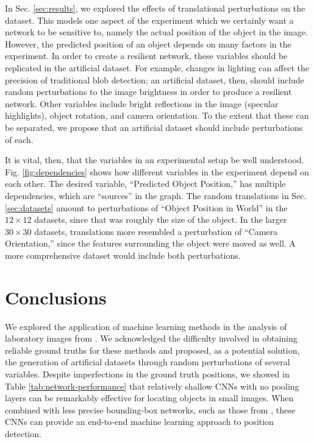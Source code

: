 \documentclass[twocolumn, 10pt]{asme2ej}
\begin{document}
In Sec. \ref{sec:results}, we explored the effects of translational
perturbations on the dataset. This models one aspect of the experiment which we
certainly want a network to be sensitive to, namely the actual position of the
object in the image. However, the predicted position of an object depends on
many factors in the experiment. In order to create a resilient network, these
variables should be replicated in the artificial dataset. For example, changes
in lighting can affect the precision of traditional blob detection; an
artificial dataset, then, should include random perturbations to the image
brightness in order to produce a resilient network. Other variables include
bright reflections in the image (specular highlights), object rotation, and
camera orientation. To the extent that these can be separated, we propose that
an artificial dataset should include perturbations of each.

It is vital, then, that the variables in an experimental setup be well
understood. Fig. \ref{fig:dependencies} shows how different variables in the
experiment depend on each other. The desired variable, ``Predicted Object
Position,'' has multiple dependencies, which are ``sources'' in the graph. The
random translations in Sec. \ref{sec:datasets} amount to perturbations of
``Object Position in World'' in the $12 \times 12$ datasets, since that was
roughly the size of the object. In the larger $30\times 30$ datasets,
translations more resembled a perturbation of ``Camera Orientation,'' since the
features surrounding the object were moved as well. A more comprehensive dataset
would include both perturbations.

\section{Conclusions}
\label{sec:conclusions}

We explored the application of machine learning methods in the analysis of
laboratory images from \cite{nash_topological_2015}. We acknowledged the
difficulty involved in obtaining reliable ground truths for these methods and
proposed, as a potential solution, the generation of artificial datasets through
random perturbations of several variables. Despite imperfections in the ground
truth positions, we showed in Table \ref{tab:network-performance} that
relatively shallow CNNs with no pooling layers can be remarkably effective for
locating objects in small images. When combined with less precise bounding-box
networks, such as those from \cite{huang_speed/accuracy_2016}, these CNNs can
provide an end-to-end machine learning approach to position detection.
\end{document}
